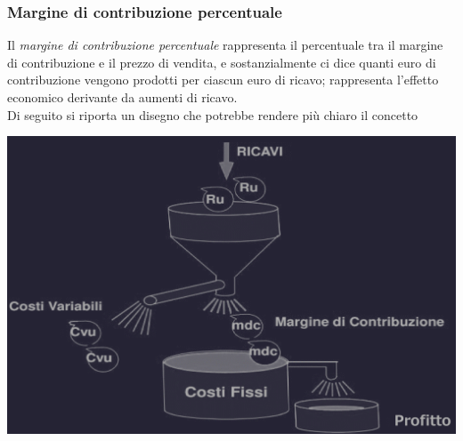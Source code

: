 \documentclass{article}
\begin{document}
\subsubsection{Margine di contribuzione percentuale}
Il \textit{margine di contribuzione percentuale} rappresenta il percentuale tra il margine di contribuzione e il prezzo di vendita, e sostanzialmente ci dice quanti euro di contribuzione vengono prodotti per ciascun euro di ricavo; rappresenta l'effetto economico derivante da aumenti di ricavo. 
\vspace*{0.2cm}\\
Di seguito si riporta un disegno che potrebbe rendere più chiaro il concetto
\begin{center}
    \includegraphics[scale=0.25]{Image/MargineContr_1.png}
\end{center}
\end{document}

